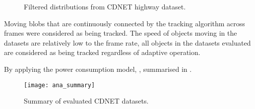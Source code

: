 \begin{figure}[htb]
  \centering
  \caption{Filtered distributions from CDNET highway dataset.}
  \label{ana:ada}
\end{figure}

Moving blobs that are continuously connected by the tracking algorithm across frames were considered as being tracked. The speed of objects moving in the datasets are relatively low to the frame rate, all objects in the datasets evaluated are considered as being tracked regardless of adaptive operation.

By applying the power consumption model, , summarised in .

\begin{figure}[htb]
  \centering
  \texttt{[image: ana\_summary]}
  \caption{Summary of evaluated CDNET datasets. }
  \label{ana:summary}
\end{figure}
